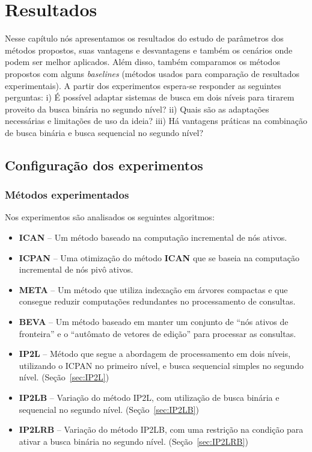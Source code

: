 \chapter{Resultados}
\label{sec:results}

Nesse capítulo nós apresentamos os resultados do estudo de parâmetros dos métodos propostos, suas vantagens e desvantagens e também os cenários onde podem ser melhor aplicados. Além disso, também comparamos os métodos propostos com alguns \textit{baselines} (métodos usados para comparação de resultados experimentais). A partir dos experimentos espera-se responder as seguintes perguntas: i) É possível adaptar sistemas de busca em dois níveis para tirarem proveito da busca binária no segundo nível? ii) Quais são as adaptações necessárias e limitações de uso da ideia? iii) Há vantagens práticas na combinação de busca binária e busca sequencial no segundo nível?

\section{Configuração dos experimentos}
\label{sec:experiments-setup}

\subsection{Métodos experimentados}
Nos experimentos são analisados os seguintes algoritmos:
\begin{itemize}
    \item \textbf{ICAN} -- Um método baseado na computação incremental de nós ativos. \citep{ji2009efficient}
    \item \textbf{ICPAN} -- Uma otimização do método \textbf{ICAN} que se baseia na computação incremental de nós pivô ativos. \citep{li2011efficient}
    \item \textbf{META} -- Um método que utiliza indexação em árvores compactas e que consegue reduzir computações redundantes no processamento de consultas. \citep{deng2016meta}
    \item \textbf{BEVA} -- Um método baseado em manter um conjunto de ``nós ativos de fronteira'' e o ``autômato de vetores de edição'' para processar as consultas. \citep{zhou2016beva}
    \item \textbf{IP2L} -- Método que segue a abordagem de processamento em dois níveis, utilizando o ICPAN no primeiro nível, e busca sequencial simples no segundo nível. (Seção~\ref{sec:IP2L})
    \item \textbf{IP2LB} -- Variação do método IP2L, com utilização de busca binária e sequencial no segundo nível. (Seção~\ref{sec:IP2LB})
    \item \textbf{IP2LRB} -- Variação do método IP2LB, com uma restrição na condição para ativar a busca binária no segundo nível. (Seção~\ref{sec:IP2LRB})
\end{itemize}

